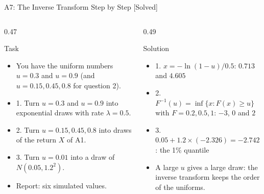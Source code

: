 \begin{frame}{A7: The Inverse Transform Step by Step [Solved]}
\itemsize{\footnotesize}
\begin{columns}[T]
\begin{column}{0.47\textwidth}
\begin{block}{Task}
\begin{itemize}
    \item You have the uniform numbers $u = 0.3$ and $u = 0.9$ (and $u = 0.15, 0.45, 0.8$ for question 2).
    \item 1. Turn $u = 0.3$ and $u = 0.9$ into exponential draws with rate $\lambda = 0.5$.
    \item 2. Turn $u = 0.15, 0.45, 0.8$ into draws of the return $X$ of A1.
    \item 3. Turn $u = 0.01$ into a draw of $N(0.05, 1.2^2)$.
    \item Report: six simulated values.
\end{itemize}
\end{block}
\end{column}
\begin{column}{0.49\textwidth}
\begin{exampleblock}{Solution}
\begin{itemize}
    \item 1. $x = -\ln(1 - u)/0.5$: $0.713$ and $4.605$
    \item 2. $F^{-1}(u) = \inf\{x : F(x) \ge u\}$ with $F = 0.2, 0.5, 1$: $-3$, $0$ and $2$
    \item 3. $0.05 + 1.2 \times (-2.326) = -2.742$: the 1\% quantile
    \item A large $u$ gives a large draw: the inverse transform keeps the order of the uniforms.
\end{itemize}
\end{exampleblock}
\end{column}
\end{columns}
\end{frame}

